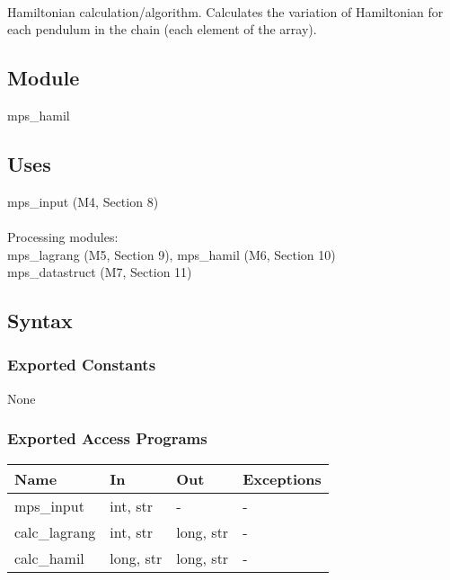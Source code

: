 \documentclass[12pt, titlepage]{article}
\begin{document}
\\

Hamiltonian calculation/algorithm. Calculates the variation of Hamiltonian for 
each pendulum in the chain (each element of the array).

\subsection{Module}

mps\_hamil

\subsection{Uses}

mps\_input (M4, Section 8)\\\\
Processing modules:\\
mps\_lagrang (M5, Section 9), mps\_hamil (M6, Section 10)\\
mps\_datastruct (M7, Section 11)\\

\subsection{Syntax}

\subsubsection{Exported Constants}

None

\subsubsection{Exported Access Programs}

\begin{center}
\begin{tabular}{p{2cm} p{4cm} p{4cm} p{2cm}}
\hline
\textbf{Name} & \textbf{In} & \textbf{Out} & \textbf{Exceptions} \\
\hline
mps\_input  & int, str & - & - \\
calc\_lagrang & int, str & long, str & - \\
calc\_hamil & long, str & long, str & - \\
\hline
\end{tabular}
\end{center}
\end{document}
